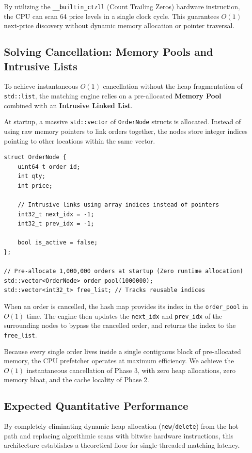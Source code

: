 \documentclass{article}
\begin{document}
By utilizing the \texttt{\_\_builtin\_ctzll} (Count Trailing Zeros) hardware instruction, the CPU can scan 64 price levels in a single clock cycle. This guarantees $O(1)$ next-price discovery without dynamic memory allocation or pointer traversal.

\subsection{Solving Cancellation: Memory Pools and Intrusive Lists}
To achieve instantaneous $O(1)$ cancellation without the heap fragmentation of \texttt{std::list}, the matching engine relies on a pre-allocated \textbf{Memory Pool} combined with an \textbf{Intrusive Linked List}.

At startup, a massive \texttt{std::vector} of \texttt{OrderNode} structs is allocated. Instead of using raw memory pointers to link orders together, the nodes store integer indices pointing to other locations within the same vector.

\begin{lstlisting}[caption={Intrusive List inside a Memory Pool}]
struct OrderNode {
    uint64_t order_id;
    int qty;
    int price;
    
    // Intrusive links using array indices instead of pointers
    int32_t next_idx = -1;
    int32_t prev_idx = -1;
    
    bool is_active = false;
};

// Pre-allocate 1,000,000 orders at startup (Zero runtime allocation)
std::vector<OrderNode> order_pool(1000000);
std::vector<int32_t> free_list; // Tracks reusable indices
\end{lstlisting}

When an order is cancelled, the hash map provides its index in the \texttt{order\_pool} in $O(1)$ time. The engine then updates the \texttt{next\_idx} and \texttt{prev\_idx} of the surrounding nodes to bypass the cancelled order, and returns the index to the \texttt{free\_list}. 

Because every single order lives inside a single contiguous block of pre-allocated memory, the CPU prefetcher operates at maximum efficiency. We achieve the $O(1)$ instantaneous cancellation of Phase 3, with zero heap allocations, zero memory bloat, and the cache locality of Phase 2.

\subsection{Expected Quantitative Performance}
By completely eliminating dynamic heap allocation (\texttt{new}/\texttt{delete}) from the hot path and replacing algorithmic scans with bitwise hardware instructions, this architecture establishes a theoretical floor for single-threaded matching latency.
\end{document}

